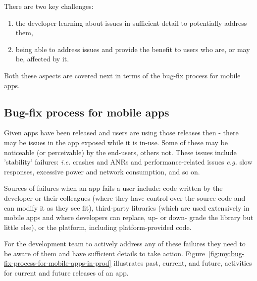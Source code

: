 There are two key challenges:
\begin{enumerate}
    \item the developer learning about issues in sufficient detail to potentially address them,
    \item being able to address issues and provide the benefit to users who are, or  may be, affected by it.
\end{enumerate}

Both these aspects are covered next in terms of the bug-fix process for mobile apps.

\subsection{Bug-fix process for mobile apps}

Given apps have been released and users are using those releases then - there may be issues in the app exposed while it is in-use. Some of these may be noticeable (or perceivable) by the end-users, others not. These issues include 'stability' failures: \textit{i.e.} crashes and ANRs and performance-related issues \textit{e.g.} slow responses, excessive power and network consumption, and so on.

Sources of failures when an app fails a user include: code written by the developer or their colleagues (where they have control over the source code and can modify it as they see fit), third-party libraries (which are used extensively in mobile apps and where developers can replace, up- or down- grade the library but little else), or the platform, including platform-provided code.

For the development team to actively address any of these failures they need to be aware of them and have sufficient details to take action. Figure~\ref{fig:my:bug-fix-process-for-mobile-apps-in-prod} illustrates past, current, and future, activities for current and future releases of an app. 

